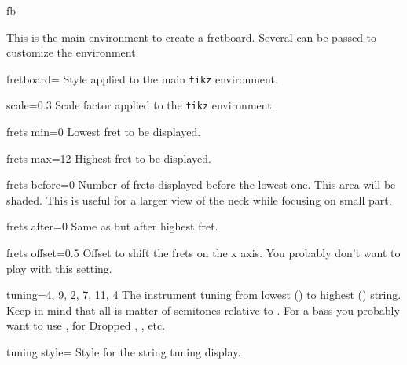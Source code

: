 \documentclass[a4paper]{article}
\newcommand{\pkg}[1]{\texttt{#1}}
\begin{document}
\begin{docEnvironment}{fb}{}

This is the main environment to create a fretboard. Several 
can be passed to customize the environment.

\begin{docKey}[fb][]{fretboard}{=}{}
  Style applied to the main \pkg{tikz} environment.
\end{docKey}

\begin{docKey}[fb][]{scale}{=}{0.3}
  Scale factor applied to the \pkg{tikz} environment.
\end{docKey}

\begin{docKey}[fb][]{frets min}{=}{0}
  Lowest fret to be displayed.
\end{docKey}

\begin{docKey}[fb][]{frets max}{=}{12}
  Highest fret to be displayed.
\end{docKey}

\begin{docKey}[fb][]{frets before}{=}{0}
  Number of frets displayed before the lowest one. This area will be
  shaded. This is useful for a larger view of the neck while focusing on
  small part.
\end{docKey}

\begin{docKey}[fb][]{frets after}{=}{0}
  Same as  but after highest fret.
\end{docKey}

\begin{docKey}[fb][]{frets offset}{=}{0.5}
  Offset to shift the frets on the x axis. You probably don't want to play
  with this setting.
\end{docKey}

\begin{docKey}[fb][]{tuning}{=}{{4, 9, 2, 7, 11, 4}}
  The instrument tuning from lowest () to highest ()
  string. Keep in mind that all is matter of semitones relative to \pC. For
  a bass you probably want to use , for Dropped \pD, 
  , etc.
\end{docKey}

\begin{docKey}[fb][]{tuning style}{=}{}
  Style for the string tuning display.
\end{docKey}


\end{docEnvironment}
\end{document}
